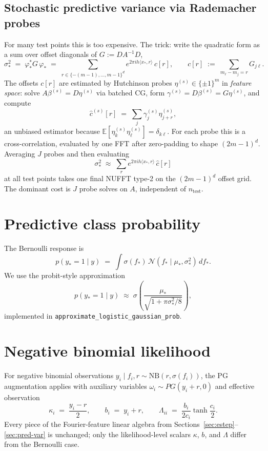 \documentclass{article}
\newcommand{\E}{\mathbb{E}}
\begin{document}
\subsection{Stochastic predictive variance via Rademacher probes}
\label{sec:pred-var-stoch}
For many test points this is too expensive. The trick: write the quadratic form as a sum over offset diagonals of $G:=DA^{-1}D$,
\[
  \sigma_{*}^{2}
  \;=\;
  \varphi_{*}^{*}G\,\varphi_{*}
  \;=\;
  \sum_{r\in\{-(m{-}1),\ldots,m{-}1\}^{d}}
  e^{2\pi i h\langle x_{*},r\rangle}\,c[r],
  \qquad
  c[r] \;:=\; \sum_{m_{\ell}-m_{j}=r}G_{j\ell}.
\]
The offsets $c[r]$ are estimated by Hutchinson probes $\eta^{(s)}\in\{\pm1\}^{m}$ in \emph{feature space}: solve $A\beta^{(s)}=D\eta^{(s)}$ via batched CG, form $\gamma^{(s)}=D\beta^{(s)}=G\eta^{(s)}$, and compute
\[
  \widehat c^{(s)}[r] \;=\; \sum_{j}\gamma^{(s)}_{j}\eta^{(s)}_{j+r},
\]
an unbiased estimator because $\E[\eta^{(s)}_{k}\eta^{(s)}_{\ell}]=\delta_{k\ell}$. For each probe this is a cross-correlation, evaluated by one FFT after zero-padding to shape $(2m-1)^{d}$. Averaging $J$ probes and then evaluating
\[
  \sigma_{*}^{2}\;\approx\;\sum_{r}e^{2\pi i h\langle x_{*},r\rangle}\,\widehat c[r]
\]
at all test points takes one final NUFFT type-2 on the $(2m-1)^{d}$ offset grid. The dominant cost is $J$ probe solves on $A$, independent of $n_{\text{test}}$.

\section{Predictive class probability}
\label{sec:pred-prob}
The Bernoulli response is
\[
  p(y_{*}=1\mid y)
  \;=\;
  \int \sigma(f_{*})\,\mathcal{N}(f_{*}\mid\mu_{*},\sigma_{*}^{2})\,df_{*}.
\]
We use the probit-style approximation
\[
  p(y_{*}=1\mid y)
  \;\approx\;
  \sigma\!\left(\frac{\mu_{*}}{\sqrt{1+\pi\sigma_{*}^{2}/8}}\right),
\]
implemented in \texttt{approximate\_logistic\_gaussian\_prob}.

\section{Negative binomial likelihood}
\label{sec:nb}

For negative binomial observations $y_i\mid f_i,r\sim\mathrm{NB}(r,\sigma(f_i))$, the PG augmentation applies with auxiliary variables $\omega_i\sim PG(y_i+r,0)$ and effective observation
\[
  \kappa_i \;=\; \frac{y_i-r}{2},
  \qquad
  b_i \;=\; y_i + r,
  \qquad
  \Lambda_{ii} \;=\; \frac{b_i}{2c_i}\tanh\!\frac{c_i}{2}.
\]
Every piece of the Fourier-feature linear algebra from Sections~\ref{sec:estep}--\ref{sec:pred-var} is unchanged; only the likelihood-level scalars $\kappa$, $b$, and $\Lambda$ differ from the Bernoulli case.
\end{document}
